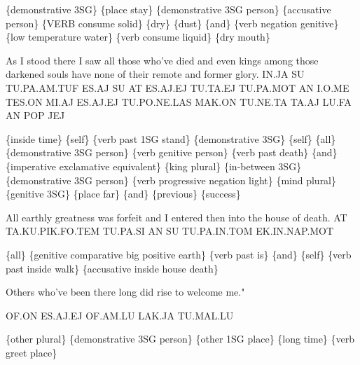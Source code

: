 {\{demonstrative 3SG\} \{place stay\} \{demonstrative 3SG person\} \{accusative person\} \{VERB consume solid\} \{dry\} \{dust\} \{and\} \{verb negation genitive\} \{low temperature water\} \{verb consume liquid\} \{dry mouth\} 

 
 

 
 

As I stood there I saw all those who've died and even kings among those darkened souls have none of their remote and former glory. 
 IN.JA SU TU.PA.AM.TUF ES.AJ SU AT ES.AJ.EJ TU.TA.EJ TU.PA.MOT AN I.O.ME TES.ON MI.AJ ES.AJ.EJ TU.PO.NE.LAS MAK.ON TU.NE.TA TA.AJ LU.FA AN POP JEJ 

\{inside time\} \{self\} \{verb past 1SG stand\} \{demonstrative 3SG\} \{self\} \{all\} \{demonstrative 3SG person\} \{verb genitive person\} \{verb past death\} \{and\} \{imperative exclamative equivalent\} \{king plural\} \{in-between 3SG\} \{demonstrative 3SG person\} \{verb progressive negation light\} \{mind plural\} \{genitive 3SG\} \{place far\} \{and\} \{previous\} \{success\} 

 
 

All earthly greatness was forfeit and I entered then into the house of death.  
 AT TA.KU.PIK.FO.TEM TU.PA.SI AN SU TU.PA.IN.TOM EK.IN.NAP.MOT 

\{all\} \{genitive comparative big positive earth\} \{verb past is\} \{and\} \{self\} \{verb past inside walk\} \{accusative inside house death\} 

 
 

Others who’ve been there long did rise to welcome me." 

OF.ON ES.AJ.EJ OF.AM.LU LAK.JA TU.MAL.LU 

\{other plural\} \{demonstrative 3SG person\} \{other 1SG place\} \{long time\} \{verb greet place\} 



}
